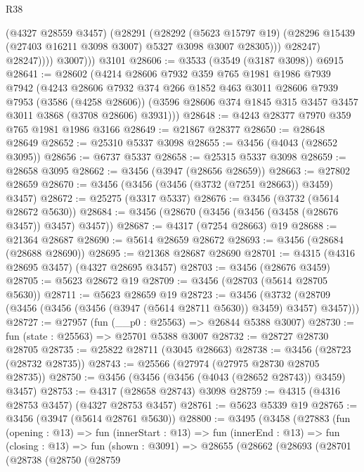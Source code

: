 \begin{lexlean}{R38}
\begin{coremodule}
                  (@4327 @28559 @3457)
                  (@28291
                    (@28292
                      (@5623 @15797 @19)
                      (@28296 @15439 (@27403 @16211 @3098 @3007) @5327 @3098 @3007 @28305)))
                  @28247)
                @28247))))
          @3007)))
    @3101
@28606 := @3533 (@3549 (@3187 @3098)) @6915
@28641 := @28602
    (@4214
      @28606
      @7932
      @359
      @765
      @1981
      @1986
      @7939
      @7942
      (@4243
        @28606
        @7932
        @374
        @266
        @1852
        @463
        @3011
        @28606
        @7939
        @7953
        (@3586 (@4258 @28606))
        (@3596 @28606 @374 @1845 @315 @3457 @3457 @3011 @3868 (@3708 @28606) @3931)))
@28648 := @4243 @28377 @7970 @359 @765 @1981 @1986 @3166
@28649 := @21867 @28377
@28650 := @28648 @28649
@28652 := @25310 @5337 @3098
@28655 := @3456 (@4043 (@28652 @3095))
@28656 := @6737 @5337
@28658 := @25315 @5337 @3098
@28659 := @28658 @3095
@28662 := @3456 (@3947 (@28656 @28659))
@28663 := @27802 @28659
@28670 := @3456 (@3456 (@3456 (@3732 (@7251 @28663)) @3459) @3457)
@28672 := @25275 (@3317 @5337)
@28676 := @3456 (@3732 (@5614 @28672 @5630))
@28684 := @3456 (@28670 (@3456 (@3456 (@3458 (@28676 @3457)) @3457) @3457))
@28687 := @4317 (@7254 @28663) @19
@28688 := @21364 @28687
@28690 := @5614 @28659 @28672
@28693 := @3456 (@28684 (@28688 @28690))
@28695 := @21368 @28687 @28690
@28701 := @4315 (@4316 @28695 @3457) (@4327 @28695 @3457)
@28703 := @3456 (@28676 @3459)
@28705 := @5623 @28672 @19
@28709 := @3456 (@28703 (@5614 @28705 @5630))
@28711 := @5623 @28659 @19
@28723 := @3456
    (@3732 (@28709 (@3456 (@3456 (@3456 (@3947 (@5614 @28711 @5630)) @3459) @3457) @3457)))
@28727 := @27957 (fun (__p0 : @25563) => @26844 @5388 @3007)
@28730 := fun (state : @25563) => @25701 @5388 @3007
@28732 := @28727 @28730 @28705
@28735 := @25822 @28711 (@3045 @28663)
@28738 := @3456 (@28723 (@28732 @28735))
@28743 := @25566 (@27974 (@27975 @28730 @28705 @28735))
@28750 := @3456 (@3456 (@3456 (@4043 (@28652 @28743)) @3459) @3457)
@28753 := @4317 (@28658 @28743) @3098
@28759 := @4315 (@4316 @28753 @3457) (@4327 @28753 @3457)
@28761 := @5623 @5339 @19
@28765 := @3456 (@3947 (@5614 @28761 @5630))
@28800 := @3495
    (@3458
      (@27883
        (fun (opening : @13) =>
        fun (innerStart : @13) =>
        fun (innerEnd : @13) =>
        fun (closing : @13) =>
        fun (shown : @3091) =>
        @28655
          (@28662
            (@28693
              (@28701
                (@28738
                  (@28750
                    (@28759

\end{coremodule}
\end{lexlean}
